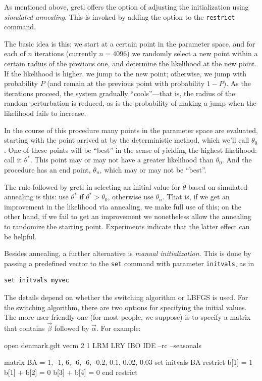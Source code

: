 As mentioned above, gretl offers the option of adjusting the
initialization using \textit{simulated annealing}.  This is invoked by
adding the  option to the \texttt{restrict} command.

The basic idea is this: we start at a certain point in the parameter
space, and for each of $n$ iterations (currently $n=4096$) we randomly
select a new point within a certain radius of the
previous one, and determine the likelihood at the new point.  If the
likelihood is higher, we jump to the new point; otherwise, we jump
with probability $P$ (and remain at the previous point with
probability $1-P$).  As the iterations proceed, the system gradually
``cools''---that is, the radius of the random perturbation is
reduced, as is the probability of making a jump when the likelihood
fails to increase.

In the course of this procedure many points in the parameter space are
evaluated, starting with the point arrived at by the deterministic
method, which we'll call $\theta_0$.  One of these points will be
``best'' in the sense of yielding the highest likelihood: call it
$\theta^*$.  This point may or may not have a greater likelihood than
$\theta_0$.  And the procedure has an end point, $\theta_n$, which may
or may not be ``best''.

The rule followed by gretl in selecting an initial value for $\theta$
based on simulated annealing is this: use $\theta^*$ if $\theta^* >
\theta_0$, otherwise use $\theta_n$.  That is, if we get an
improvement in the likelihood via annealing, we make full use of this;
on the other hand, if we fail to get an improvement we nonetheless
allow the annealing to randomize the starting point.  Experiments
indicate that the latter effect can be helpful.

Besides annealing, a further alternative is \textit{manual
  initialization}.  This is done by passing a predefined vector to the
\texttt{set} command with parameter \texttt{initvals}, as in
%
\begin{verbatim}
set initvals myvec
\end{verbatim}

The details depend on whether the switching algorithm or LBFGS is
used.  For the switching algorithm, there are two options for
specifying the initial values.  The more user-friendly one (for most
people, we suppose) is to specify a matrix that contains $\vec{\beta}$
followed by $\vec{\alpha}$. For example:
\begin{code}
open denmark.gdt
vecm 2 1 LRM LRY IBO IDE --rc --seasonals

matrix BA = {1, -1, 6, -6, -6, -0.2, 0.1, 0.02, 0.03}
set initvals BA
restrict
  b[1] = 1
  b[1] + b[2] = 0
  b[3] + b[4] = 0
end restrict
\end{code}

